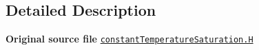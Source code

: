 \subsection{Detailed Description}
{\bfseries Original source file} \href{../../../home/carlo/data/GeN-Foam/GeN-Foam_ffn/GeN-Foam/GeN-Foam/classes/thermalHydraulics/src/physicsModels/phaseChangeModels/saturationModels/constantTemperature/constantTemperatureSaturation.H}{\tt constant\+Temperature\+Saturation.\+H} 